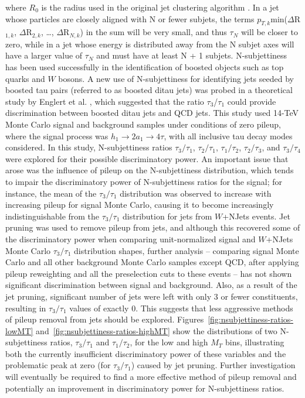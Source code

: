 \noindent where $R_{0}$ is the radius used in the original jet clustering algorithm \cite{Thaler:2010tr}.\newline
In a jet whose particles are closely aligned with N or fewer subjets, the terms $p_{T,k}$min($\Delta$R$_{1,k}$, $\Delta$R$_{2,k}$, \dots, $\Delta$R$_{N,k}$) in the sum will be very small, and thus $\tau_{N}$ will be closer to zero, while in a jet whose energy is distributed away from the N subjet axes will have a larger value of $\tau_{N}$ and must have at least N + 1 subjets.\newline
N-subjettiness has been used successfully in the identification of boosted objects such as top quarks and $W$ bosons. A new use of N-subjettiness for identifying jets seeded by boosted tau pairs (referred to as boosted ditau jets) was probed in a theoretical study by Englert et al. \cite{Englert:2011iz}, which suggested that the ratio $\tau_{3}$/$\tau_{1}$ could provide discrimination between boosted ditau jets and QCD jets. This study used 14-TeV Monte Carlo signal and background samples under conditions of zero pileup, where the signal process was  $h_{1}\rightarrow 2a_{1}\rightarrow 4\tau$, with all inclusive tau decay modes considered.\newline
In this study, N-subjettiness ratios $\tau_{3}/\tau_{1}$, $\tau_{2}/\tau_{1}$, $\tau_{1}/\tau_{2}$, $\tau_{2}/\tau_{3}$, and $\tau_{3}/\tau_{4}$  were explored for their possible discriminatory power. An important issue that arose was the influence of pileup on the N-subjettiness distribution, which tends to impair the discriminatory power of N-subjettiness ratios for the signal; for instance, the mean of the $\tau_{3}/\tau_{1}$ distribution was observed to increase with increasing pileup for signal Monte Carlo, causing it to become increasingly indistinguishable from the $\tau_{3}/\tau_{1}$ distribution for jets from $W$+NJets events. Jet pruning was used to remove pileup from jets, and although this recovered some of the discriminatory power when comparing unit-normalized signal and $W$+NJets Monte Carlo $\tau_{3}/\tau_{1}$ distribution shapes, further analysis -- comparing signal Monte Carlo and all other background Monte Carlo samples except QCD, after applying pileup reweighting and all the preselection cuts to these events -- has not shown significant discrimination between signal and background. Also, as a result of the jet pruning, significant number of jets were left with only 3 or fewer constituents, resulting in $\tau_{3}/\tau_{1}$ values of exactly 0. This suggests that less aggressive methods of pileup removal from jets should be explored. Figures~\ref{fig:nsubjettiness-ratios-lowMT} and~\ref{fig:nsubjettiness-ratios-highMT} show the distributions of two N-subjettiness ratios, $\tau_{3}/\tau_{1}$ and $\tau_{1}/\tau_{2}$, for the low and high $M_{T}$ bins, illustrating both the currently insufficient discriminatory power of these variables and the problematic peak at zero (for $\tau_{3}/\tau_{1}$) caused by jet pruning. Further investigation will eventually be required to find a more effective method of pileup removal and potentially an improvement in discriminatory power for N-subjettiness ratios.

